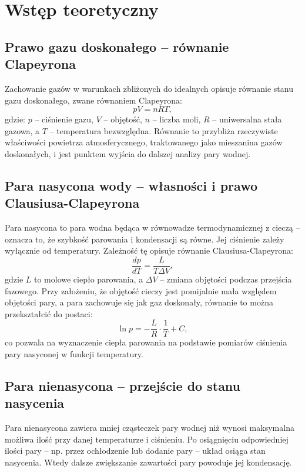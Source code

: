 \documentclass[12pt]{article}
\begin{document}
\maketitle

\section*{Wstęp teoretyczny}

\subsection*{Prawo gazu doskonałego – równanie Clapeyrona}
Zachowanie gazów w warunkach zbliżonych do idealnych opisuje równanie stanu gazu doskonałego, zwane równaniem Clapeyrona:
\[
    pV = nRT,
\]
gdzie: $p$ – ciśnienie gazu, $V$ – objętość, $n$ – liczba moli, $R$ – uniwersalna stała gazowa, a $T$ – temperatura bezwzględna. Równanie to przybliża rzeczywiste właściwości powietrza atmosferycznego, traktowanego jako mieszanina gazów doskonałych, i jest punktem wyjścia do dalszej analizy pary wodnej.

\subsection*{Para nasycona wody – własności i prawo Clausiusa-Clapeyrona}
Para nasycona to para wodna będąca w równowadze termodynamicznej z cieczą – oznacza to, że szybkość parowania i kondensacji są równe. Jej ciśnienie zależy wyłącznie od temperatury. Zależność tę opisuje równanie Clausiusa-Clapeyrona:
\[
    \frac{d p}{d T} = \frac{L}{T \Delta V},
\]
gdzie $L$ to molowe ciepło parowania, a $\Delta V$ – zmiana objętości podczas przejścia fazowego. Przy założeniu, że objętość cieczy jest pomijalnie mała względem objętości pary, a para zachowuje się jak gaz doskonały, równanie to można przekształcić do postaci:
\[
    \ln p = -\frac{L}{R} \cdot \frac{1}{T} + C,
\]
co pozwala na wyznaczenie ciepła parowania na podstawie pomiarów ciśnienia pary nasyconej w funkcji temperatury.

\subsection*{Para nienasycona – przejście do stanu nasycenia}
Para nienasycona zawiera mniej cząsteczek pary wodnej niż wynosi maksymalna możliwa ilość przy danej temperaturze i ciśnieniu. Po osiągnięciu odpowiedniej ilości pary – np. przez ochłodzenie lub dodanie pary – układ osiąga stan nasycenia. Wtedy dalsze zwiększanie zawartości pary powoduje jej kondensację.
\end{document}
